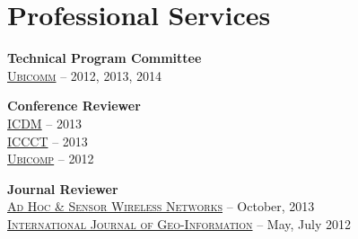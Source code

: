 \section{\sc Professional Services}
{\bf Technical Program Committee}\\
{\href{http://www.iaria.org/conferences.html}{\textsc{Ubicomm}}} -- 2012, 2013, 2014

{\bf Conference Reviewer}\\
{\href{http://icdm2013.rutgers.edu}{\textsc{ICDM}}} -- 2013\\
{\href{http://www.mnnit.ac.in/iccct2013}{\textsc{ICCCT}}} -- 2013\\
{\href{http://www.ubicomp.org/ubicomp2012}{\textsc{Ubicomp}}} -- 2012

{\bf Journal Reviewer}\\
{\href{http://www.oldcitypublishing.com/AHSWN/AHSWN.html}{\textsc{Ad Hoc \& Sensor Wireless Networks}}} -- October, 2013\\
{\href{http://www.mdpi.com/journal/ijgi}{\textsc{International Journal of Geo-Information}}} -- May, July 2012
